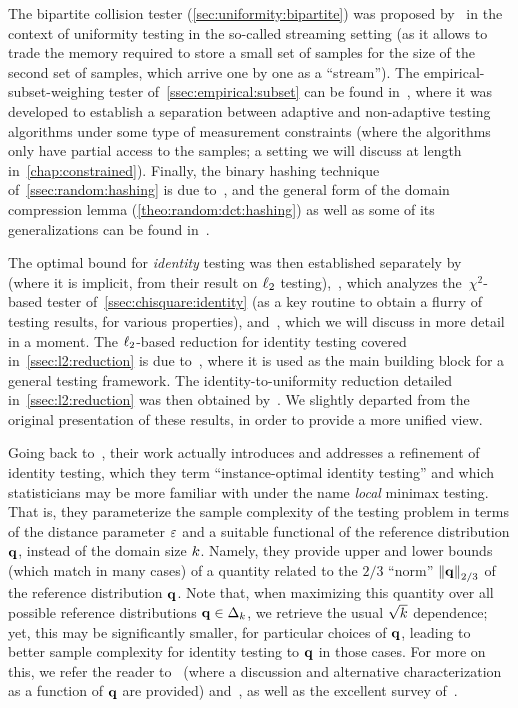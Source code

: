The bipartite collision tester (\cref{sec:uniformity:bipartite}) was proposed by~\citet{DiakonikolasGKR19} in the context of uniformity testing in the so-called streaming setting (as it allows to trade the memory required to store a small set of samples for the size of the second set of samples, which arrive one by one as a ``stream''). The empirical-subset-weighing tester of~\cref{ssec:empirical:subset} can be found in~\citet{AcharyaCLST21}, where it was developed to establish a separation between adaptive and non-adaptive testing algorithms under some type of measurement constraints (where the algorithms only have partial access to the samples; a setting we will discuss at length in~\cref{chap:constrained}). 
Finally, the binary hashing technique of~\cref{ssec:random:hashing} is due to~\citet{AcharyaCT19b}, and the general form of the domain compression lemma (\cref{theo:random:dct:hashing}) as well as some of its generalizations can be found in~\citet{AcharyaCT19b,AcharyaCHST20,AminJM20}.\medskip


The optimal bound for \emph{identity} testing was then established separately by~\citet{ChanDVV14} (where it is implicit, from their result on $\lp[2]$ testing),~\citep{AcharyaDK15}, which analyzes the~$\chi^2$-based tester of~\cref{ssec:chisquare:identity} (as a key routine to obtain a flurry of testing results, for various properties), and~\citet{ValiantV17}, which we will discuss in more detail in a moment.
The $\lp[2]$-based reduction for identity testing covered in~\cref{ssec:l2:reduction} is due to~\citet{DiakonikolasK16}, where it is used as the main building block for a general testing framework. The identity-to-uniformity reduction detailed in~\cref{ssec:l2:reduction} was then obtained by~\citet{Goldreich16}. We slightly departed from the original presentation of these results, in order to provide a more unified view.

Going back to~\citet{ValiantV17}, their work actually introduces and addresses a refinement of identity testing, which they term ``instance-optimal identity testing'' and which statisticians may be more familiar with under the name \emph{local} minimax testing. That is, they parameterize the sample complexity of the testing problem in terms of the distance parameter $\dst$ and a suitable functional of the reference distribution $\q$, instead of the domain size $\ab$. Namely, they provide upper and lower bounds (which match in many cases) of a quantity related to the $2/3$ ``norm'' $\norm{\q}_{2/3}$ of the reference distribution $\q$. Note that, when maximizing this quantity over all possible reference distributions $\q\in\distribs{\ab}$, we retrieve the usual $\sqrt{\ab}$ dependence; yet, this may be significantly smaller, for particular choices of $\q$, leading to better sample complexity for identity testing to $\q$ in those cases. For more on this, we refer the reader to~\citet{BlaisCG19} (where a discussion and alternative characterization as a function of $\q$ are provided) and~\citet{DiakonikolasK16}, as well as the excellent survey of~\citet{BalakrishnanW18}.\medskip

